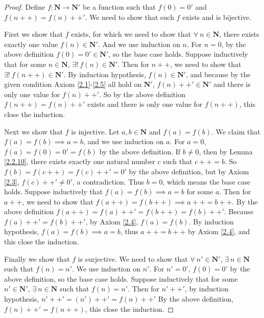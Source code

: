 \begin{proof}
Define \(f : \mathbf{N} \to \mathbf{N}'\) be a function such that \(f(0) = 0'\) and \(f(n++) = f(n)++'\).
We need to show that such \(f\) exists and is bijective.

First we show that \(f\) exists, for which we need to show that \(\forall\ n \in \mathbf{N}\), there exists exactly one value \(f(n) \in \mathbf{N}'\).
And we use induction on \(n\).
For \(n = 0\), by the above definition \(f(0) = 0' \in \mathbf{N}'\), so the base case holds.
Suppose inductively that for some \(n \in \mathbf{N}\), \(\exists!\ f(n) \in \mathbf{N}'\).
Then for \(n++\), we need to show that \(\exists!\ f(n++) \in \mathbf{N}'\).
By induction hypothesis, \(f(n) \in \mathbf{N}'\), and because by the given condition Axiom \ref{2.1}-\ref{2.5} all hold on \(\mathbf{N}'\), \(f(n)++' \in \mathbf{N}'\) and there is only one value for \(f(n)++'\).
So by the above definition \(f(n++) = f(n)++'\) exists and there is only one value for \(f(n++)\), this close the induction.

Next we show that \(f\) is injective.
Let \(a, b \in \mathbf{N}\) and \(f(a) = f(b)\).
We claim that \(f(a) = f(b) \implies a = b\), and we use induction on \(a\).
For \(a = 0\), \(f(a) = f(0) = 0' = f(b)\) by the above definition.
If \(b \neq 0\), then by Lemma \ref{2.2.10}, there exists exactly one natural number \(c\) such that \(c++ = b\).
So \(f(b) = f(c++) = f(c)++' = 0'\) by the above definition, but by Axiom \ref{2.3}, \(f(c)++' \neq 0'\), a contradiction.
Thus \(b = 0\), which means the base case holds.
Suppose inductively that \(f(a) = f(b) \implies a = b\) for some \(a\).
Then for \(a++\), we need to show that \(f(a++) = f(b++) \implies a++ = b++\).
By the above definition \(f(a++) = f(a)++' = f(b++) = f(b)++'\).
Because \(f(a)++' = f(b)++'\), by Axiom \ref{2.4}, \(f(a) = f(b)\).
By induction hypothesis, \(f(a) = f(b) \implies a = b\), thus \(a++ = b++\) by Axiom \ref{2.4}, and this close the induction.

Finally we show that \(f\) is surjective.
We need to show that \(\forall\ n' \in \mathbf{N}'\), \(\exists\ n \in \mathbf{N}\) such that \(f(n) = n'\).
We use induction on \(n'\).
For \(n' = 0'\), \(f(0) = 0'\) by the above definition, so the base case holds.
Suppose inductively that for some \(n' \in \mathbf{N}'\), \(\exists\ n \in \mathbf{N}\) such that \(f(n) = n'\).
Then for \(n'++'\), by induction hypothesis, \(n'++' = (n')++' = f(n)++'\)
By the above definition, \(f(n)++' = f(n++)\), this close the induction.
\end{proof}